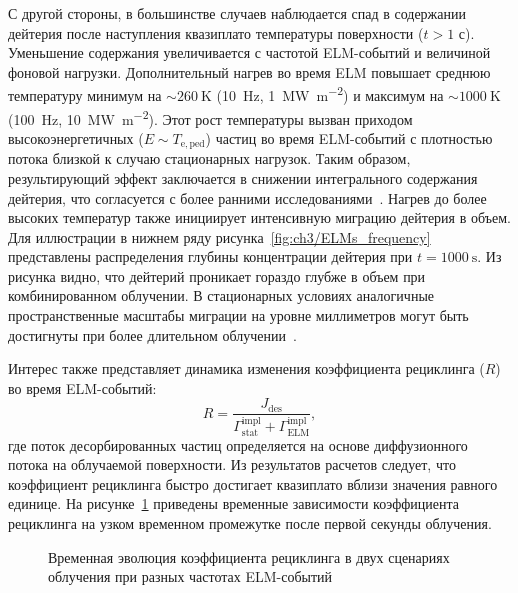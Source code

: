 С другой стороны, в большинстве случаев наблюдается спад в содержании дейтерия после наступления квазиплато температуры поверхности ($t>1$ с). Уменьшение содержания увеличивается с частотой ELM-событий и величиной фоновой нагрузки. Дополнительный нагрев во время ELM повышает среднюю температуру минимум на $\sim\SI{260}{\kelvin}$ (\SI{10}{\hertz}, \SI{1}{\mega\watt\per\meter\squared}) и максимум на $\sim\SI{1000}{\kelvin}$ (\SI{100}{\hertz}, \SI{10}{\mega\watt\per\meter\squared}). Этот рост температуры вызван приходом высокоэнергетичных ($E\sim T_{\mathrm{e,ped}}$) частиц во время ELM-событий с плотностью потока близкой к случаю стационарных нагрузок. Таким образом, результирующий эффект заключается в снижении интегрального содержания дейтерия, что согласуется с более ранними исследованиями~\cite{Hu2015}. Нагрев до более высоких температур также инициирует интенсивную миграцию дейтерия в объем. Для иллюстрации в нижнем ряду рисунка~\cref{fig:ch3/ELMs_frequency} представлены распределения глубины концентрации дейтерия при $t=\SI{1000}{\second}$. Из рисунка видно, что дейтерий проникает гораздо глубже в объем при комбинированном облучении. В стационарных условиях аналогичные пространственные масштабы миграции на уровне миллиметров могут быть достигнуты при более длительном облучении~\cite{Hodille2021}.

Интерес также представляет динамика изменения коэффициента рециклинга (\( R \)) во время ELM-событий:
\begin{equation}
	R = \frac{J_\mathrm{des}}{\Gamma^{\mathrm{impl}}_\mathrm{stat}+\Gamma^{\mathrm{impl}}_\mathrm{ELM}},
\end{equation}
где поток десорбированных частиц определяется на основе диффузионного потока на облучаемой поверхности. Из результатов расчетов следует, что коэффициент рециклинга быстро достигает квазиплато вблизи значения равного единице. На рисунке~\cref{fig:ch3/R_freq} приведены временные зависимости коэффициента рециклинга на узком временном промежутке после первой секунды облучения.   
\begin{figure}[ht]
	\caption{Временная эволюция коэффициента рециклинга в двух сценариях облучения при разных частотах ELM-событий}\label{fig:ch3/R_freq}
\end{figure}

